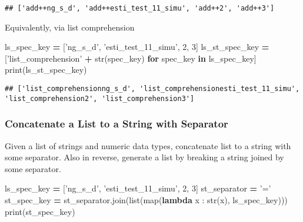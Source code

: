 \documentclass[
]{book}
\newenvironment{Shaded}{\begin{snugshade}}{\end{snugshade}}
\newcommand{\BuiltInTok}[1]{#1}
\newcommand{\ControlFlowTok}[1]{\textcolor[rgb]{0.13,0.29,0.53}{\textbf{#1}}}
\newcommand{\DecValTok}[1]{\textcolor[rgb]{0.00,0.00,0.81}{#1}}
\newcommand{\KeywordTok}[1]{\textcolor[rgb]{0.13,0.29,0.53}{\textbf{#1}}}
\newcommand{\NormalTok}[1]{#1}
\newcommand{\OperatorTok}[1]{\textcolor[rgb]{0.81,0.36,0.00}{\textbf{#1}}}
\newcommand{\StringTok}[1]{\textcolor[rgb]{0.31,0.60,0.02}{#1}}
\begin{document}
\begin{verbatim}
## ['add++ng_s_d', 'add++esti_test_11_simu', 'add++2', 'add++3']
\end{verbatim}

Equivalently, via list comprehension

\begin{Shaded}
\begin{Highlighting}[]
\NormalTok{ls_spec_key }\OperatorTok{=}\NormalTok{ [}\StringTok{'ng_s_d'}\NormalTok{, }\StringTok{'esti_test_11_simu'}\NormalTok{, }\DecValTok{2}\NormalTok{, }\DecValTok{3}\NormalTok{]}
\NormalTok{ls_st_spec_key }\OperatorTok{=}\NormalTok{ [}\StringTok{'list_comprehension'} \OperatorTok{+} \BuiltInTok{str}\NormalTok{(spec_key) }\ControlFlowTok{for}\NormalTok{ spec_key }\KeywordTok{in}\NormalTok{ ls_spec_key]}
\BuiltInTok{print}\NormalTok{(ls_st_spec_key)}
\end{Highlighting}
\end{Shaded}

\begin{verbatim}
## ['list_comprehensionng_s_d', 'list_comprehensionesti_test_11_simu', 'list_comprehension2', 'list_comprehension3']
\end{verbatim}

\hypertarget{concatenate-a-list-to-a-string-with-separator}{%
\subsubsection{Concatenate a List to a String with Separator}\label{concatenate-a-list-to-a-string-with-separator}}

Given a list of strings and numeric data types, concatenate list to a string with some separator. Also in reverse, generate a list by breaking a string joined by some separator.

\begin{Shaded}
\begin{Highlighting}[]
\NormalTok{ls_spec_key }\OperatorTok{=}\NormalTok{ [}\StringTok{'ng_s_d'}\NormalTok{, }\StringTok{'esti_test_11_simu'}\NormalTok{, }\DecValTok{2}\NormalTok{, }\DecValTok{3}\NormalTok{]}
\NormalTok{st_separator }\OperatorTok{=} \StringTok{'='}
\NormalTok{st_spec_key }\OperatorTok{=}\NormalTok{ st_separator.join(}\BuiltInTok{list}\NormalTok{(}\BuiltInTok{map}\NormalTok{(}\KeywordTok{lambda}\NormalTok{ x : }\BuiltInTok{str}\NormalTok{(x), ls_spec_key)))}
\BuiltInTok{print}\NormalTok{(st_spec_key)}
\end{Highlighting}
\end{Shaded}
\end{document}
